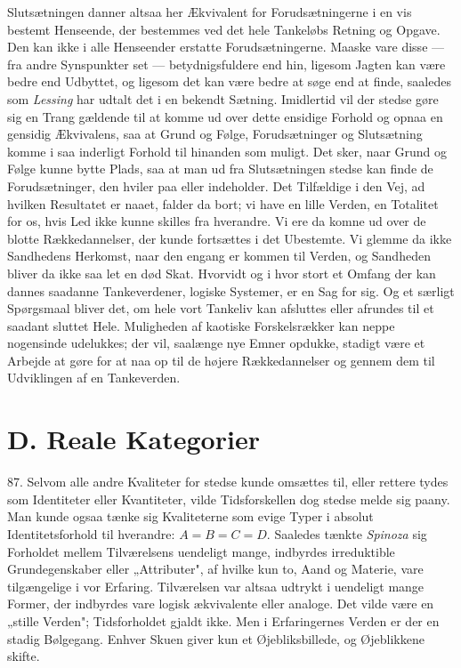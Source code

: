 \documentclass[12pt,a4paper]{book}
\newcommand{\apage}[1]{\marginnote{\footnotesize\textit{[#1]}}}
\begin{document}
Slutsætningen danner altsaa her Ækvivalent for Forudsætningerne i en vis bestemt
Henseende, der bestemmes ved det hele Tankeløbs Retning og Opgave. Den kan ikke i
alle Henseender erstatte Forudsætningerne. Maaske vare disse --- fra andre
Synspunkter set --- betydnigsfuldere end hin, ligesom Jagten kan være bedre end
Udbyttet, og ligesom det kan være bedre at søge end at finde, saaledes som
\emph{Lessing} har udtalt det i en bekendt Sætning. Imidlertid vil der stedse
gøre sig en Trang gældende til at komme ud over dette ensidige Forhold og opnaa
en gensidig Ækvivalens, saa at Grund og Følge, Forudsætninger og Slutsætning
komme i saa inderligt Forhold til hinanden som muligt. Det sker, naar Grund og
Følge kunne bytte Plads, saa at man ud fra Slutsætningen stedse kan finde de
Forudsætninger, den hviler paa eller indeholder. Det Tilfældige i den Vej, ad
hvilken Resultatet er naaet, falder da bort; vi have en lille Verden, en
Totalitet for os, hvis Led ikke kunne skilles fra hverandre. Vi ere da komne ud
over de blotte Rækkedannelser, der kunde fortsættes i det Ubestemte. Vi glemme \apage{207} da
ikke Sandhedens Herkomst, naar den engang er kommen til Verden, og Sandheden
bliver da ikke saa let en død Skat. Hvorvidt og i hvor stort et Omfang der kan dannes saadanne Tankeverdener, logiske
Systemer, er en Sag for sig. Og et særligt Spørgsmaal bliver det, om hele vort
Tankeliv kan afsluttes eller afrundes til et saadant sluttet Hele. Muligheden af
kaotiske Forskelsrækker kan neppe nogensinde udelukkes; der vil, saalænge nye
Emner opdukke, stadigt være et Arbejde at gøre for at naa op til de højere
Rækkedannelser og gennem dem til Udviklingen af en Tankeverden.

\section*{D. Reale Kategorier}
\label{sec:reale-kategorier}

87. Selvom alle andre Kvaliteter for stedse kunde omsættes til, eller rettere
tydes som Identiteter eller Kvantiteter, vilde Tidsforskellen dog stedse melde
sig paany. Man kunde ogsaa tænke sig Kvaliteterne som evige Typer i absolut
Identitetsforhold til hverandre: $A=B=C=D$. Saaledes tænkte \emph{Spinoza} sig
Forholdet mellem Tilværelsens uendeligt mange, indbyrdes irreduktible
Grundegenskaber eller „Attributer", af hvilke kun to, Aand og Materie, vare
tilgængelige i vor Erfaring. Tilværelsen var altsaa udtrykt i uendeligt mange
Former, der indbyrdes vare logisk ækvivalente eller analoge. Det vilde være en
„stille Verden"; Tidsforholdet gjaldt ikke. Men i Erfaringernes Verden er der en
stadig Bølgegang. Enhver Skuen giver kun et Øjebliksbillede, og Øjeblikkene
skifte.
\end{document}
